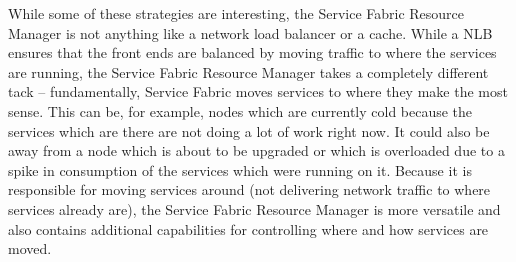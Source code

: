 While some of these strategies are interesting, the Service Fabric
Resource Manager is not anything like a network load balancer or a
cache. While a NLB ensures that the front ends are balanced by moving
traffic to where the services are running, the Service Fabric Resource
Manager takes a completely different tack – fundamentally, Service
Fabric moves services to where they make the most sense. This can be,
for example, nodes which are currently cold because the services which
are there are not doing a lot of work right now. It could also be away
from a node which is about to be upgraded or which is overloaded due
to a spike in consumption of the services which were running on
it. Because it is responsible for moving services around (not
delivering network traffic to where services already are), the Service
Fabric Resource Manager is more versatile and also contains additional
capabilities for controlling where and how services are moved.

